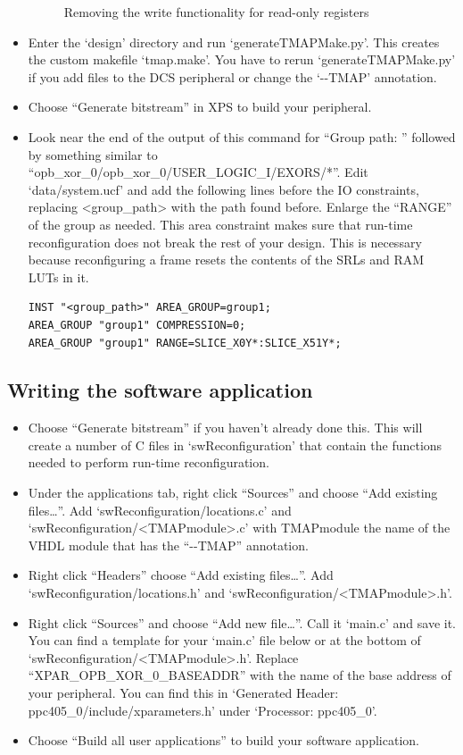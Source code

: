 \documentclass[a4paper,oneside]{memoir}
\begin{document}
\begin{itemize}
\begin{figure}[H]
\caption{Removing the write functionality for read-only registers\label{fig:design1}}
\end{figure}
\item Enter the `design' directory and run `generateTMAPMake.py'. This creates the custom makefile `tmap.make'. You have to rerun `generateTMAPMake.py' if you add files to the DCS peripheral or change the `-\--TMAP' annotation.
\item Choose ``Generate bitstream'' in XPS to build your peripheral.
\item Look near the end of the output of this command for ``Group path: '' followed by something similar to ``opb\_xor\_0/opb\_xor\_0/USER\_LOGIC\_I/EXORS/*''.
Edit `data/system.ucf' and add the following lines before the IO constraints, replacing <group\_path> with the path found before. Enlarge the ``RANGE'' of the group as needed. This area constraint makes sure that  run-time reconfiguration does not break the rest of your design. This is necessary because reconfiguring a frame resets the contents of the SRLs and RAM LUTs in it. 

\lstset{language=}
\begin{lstlisting}
INST "<group_path>" AREA_GROUP=group1;
AREA_GROUP "group1" COMPRESSION=0;
AREA_GROUP "group1" RANGE=SLICE_X0Y*:SLICE_X51Y*;
\end{lstlisting}


\end{itemize}

\subsection{Writing the software application}\label{sec:writing_software}
\begin{itemize}
\item Choose ``Generate bitstream'' if you haven't already done this. This will create a number of C files in `swReconfiguration' that  contain the functions needed to perform run-time reconfiguration.
\item Under the applications tab, right click ``Sources'' and choose ``Add existing files\dots''. Add `swReconfiguration/locations.c' and `swReconfiguration/<TMAPmodule>.c' with TMAPmodule the name of the VHDL module that has the ``-\--TMAP'' annotation.
\item Right click ``Headers'' choose ``Add existing files\dots''. Add `swReconfiguration/locations.h' and `swReconfiguration/<TMAPmodule>.h'.
\item Right click ``Sources'' and choose ``Add new file\dots''. Call it `main.c' and save it.\\
You can find a template for your `main.c' file below or at the bottom of `swReconfiguration/<TMAPmodule>.h'. Replace ``XPAR\_OPB\_XOR\_0\_BASEADDR'' with the name of the base address of your peripheral. You can find this in `Generated Header: ppc405\_0/include/xparameters.h' under  `Processor: ppc405\_0'.
\item Choose ``Build all user applications'' to build your software application.
\end{itemize}
\end{document}
